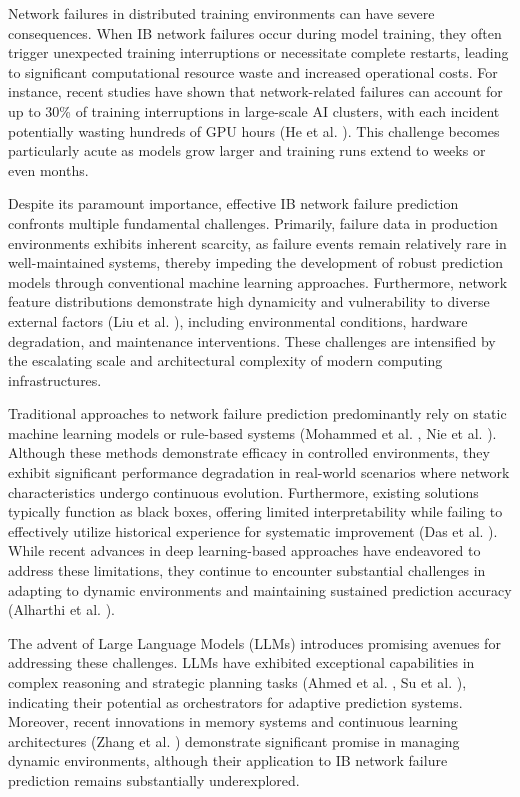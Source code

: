 \documentclass[conference]{IEEEtran}
\begin{document}
Network failures in distributed training environments can have severe consequences. When IB network failures occur during model training, they often trigger unexpected training interruptions or necessitate complete restarts, leading to significant computational resource waste and increased operational costs. For instance, recent studies have shown that network-related failures can account for up to 30\% of training interruptions in large-scale AI clusters, with each incident potentially wasting hundreds of GPU hours (He et al. \cite{b6}). This challenge becomes particularly acute as models grow larger and training runs extend to weeks or even months.

Despite its paramount importance, effective IB network failure prediction confronts multiple fundamental challenges. Primarily, failure data in production environments exhibits inherent scarcity, as failure events remain relatively rare in well-maintained systems, thereby impeding the development of robust prediction models through conventional machine learning approaches. Furthermore, network feature distributions demonstrate high dynamicity and vulnerability to diverse external factors (Liu et al. \cite{b8}), including environmental conditions, hardware degradation, and maintenance interventions. These challenges are intensified by the escalating scale and architectural complexity of modern computing infrastructures.

Traditional approaches to network failure prediction predominantly rely on static machine learning models or rule-based systems (Mohammed et al. \cite{b9}, Nie et al. \cite{b10}). Although these methods demonstrate efficacy in controlled environments, they exhibit significant performance degradation in real-world scenarios where network characteristics undergo continuous evolution. Furthermore, existing solutions typically function as black boxes, offering limited interpretability while failing to effectively utilize historical experience for systematic improvement (Das et al. \cite{b5}). While recent advances in deep learning-based approaches have endeavored to address these limitations, they continue to encounter substantial challenges in adapting to dynamic environments and maintaining sustained prediction accuracy (Alharthi et al. \cite{b2}).

The advent of Large Language Models (LLMs) introduces promising avenues for addressing these challenges. LLMs have exhibited exceptional capabilities in complex reasoning and strategic planning tasks (Ahmed et al. \cite{b1}, Su et al. \cite{b12}), indicating their potential as orchestrators for adaptive prediction systems. Moreover, recent innovations in memory systems and continuous learning architectures (Zhang et al. \cite{b13}) demonstrate significant promise in managing dynamic environments, although their application to IB network failure prediction remains substantially underexplored.
\end{document}
